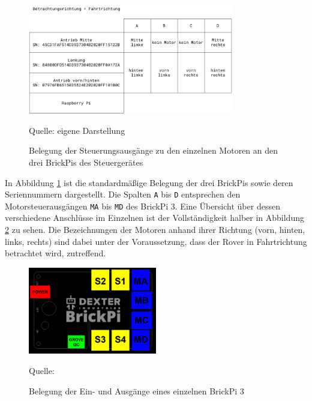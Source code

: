 \begin{figure} %
	\centering
	\includegraphics[width=0.8\textwidth]{../Images/brickpiconfig.pdf}
	\vspace{0.5em}
	\parbox[c]{0.8\linewidth}{\footnotesize
		\centering
		\vspace{1em}
		Quelle: eigene Darstellung
	}
	\caption{Belegung der Steuerungsausgänge zu den einzelnen Motoren an den drei BrickPis des Steuergerätes}
	\label{fig:brickpistack}
\end{figure}

In Abbildung \ref{fig:brickpistack} ist die standardmäßige Belegung der drei BrickPis sowie deren Seriennummern dargestellt.
Die Spalten \texttt{A} bis \texttt{D} entsprechen den Motorsteuerausgängen \texttt{MA} bis \texttt{MD} des BrickPi 3.
Eine Übersicht über dessen verschiedene Anschlüsse im Einzelnen ist der Vollständigkeit halber in Abbildung \ref{fig:brickpi3ports} zu sehen.
Die Bezeichnungen der Motoren anhand ihrer Richtung (vorn, hinten, links, rechts) sind dabei unter der Voraussetzung, dass der Rover in Fahrtrichtung betrachtet wird, zutreffend.

\begin{figure}
	\centering
	\includegraphics[width=0.5\textwidth]{../Images/BrickPi3-Port-Layout.png}
	\vspace{0.5em}
	\parbox[c]{0.8\linewidth}{\footnotesize
		\centering
		\vspace{1em}
		Quelle: \cite{dexter2017}
	}
	\caption{Belegung der Ein- und Ausgänge eines einzelnen BrickPi 3}
	\label{fig:brickpi3ports}
\end{figure}

